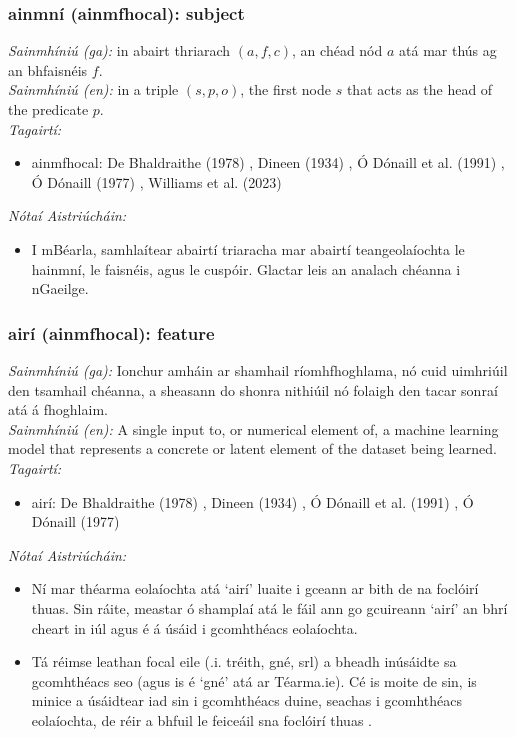 \documentclass{article}
\begin{document}
\subsubsection*{ainmní (ainmfhocal): subject}
 \noindent \textit{Sainmhíniú (ga):} in abairt thriarach $(a,f,c)$, an chéad nód $a$ atá mar thús ag an bhfaisnéis $f$.
\\
 \noindent \textit{Sainmhíniú (en):} in a triple $(s,p,o)$, the first node $s$ that acts as the head of the predicate $p$.
\\
 \noindent \textit{Tagairtí:}
\begin{itemize}
	\item ainmfhocal: De Bhaldraithe (1978) \cite{de-bhaldraithe}, Dineen (1934) \cite{dineen}, Ó Dónaill et al. (1991) \cite{focloir-beag}, Ó Dónaill (1977) \cite{odonaill}, Williams et al. (2023) \cite{storchiste}
\end{itemize}

 \noindent \textit{Nótaí Aistriúcháin:}
\begin{itemize}
	\item I mBéarla, samhlaítear abairtí triaracha mar abairtí teangeolaíochta le hainmní, le faisnéis, agus le cuspóir. Glactar leis an analach chéanna i nGaeilge.
\end{itemize}


\subsubsection*{airí (ainmfhocal): feature}
 \noindent \textit{Sainmhíniú (ga):} Ionchur amháin ar shamhail ríomhfhoghlama, nó cuid uimhriúil den tsamhail chéanna, a sheasann do shonra nithiúil nó folaigh den tacar sonraí atá á fhoghlaim.
\\
 \noindent \textit{Sainmhíniú (en):} A single input to, or numerical element of, a machine learning model that represents a concrete or latent element of the dataset being learned.
\\
 \noindent \textit{Tagairtí:}
\begin{itemize}
	\item airí: De Bhaldraithe (1978) \cite{de-bhaldraithe}, Dineen (1934) \cite{dineen}, Ó Dónaill et al. (1991) \cite{focloir-beag}, Ó Dónaill (1977) \cite{odonaill}
\end{itemize}

 \noindent \textit{Nótaí Aistriúcháin:}
\begin{itemize}
	\item Ní mar théarma eolaíochta atá `airí' luaite i gceann ar bith de na foclóirí thuas. Sin ráite, meastar ó shamplaí atá le fáil ann go gcuireann `airí' an bhrí cheart in iúl agus é á úsáid i gcomhthéacs eolaíochta.
	\item Tá réimse leathan focal eile (.i. tréith, gné, srl) a bheadh inúsáidte sa gcomhthéacs seo (agus is é `gné' atá ar Téarma.ie). Cé is moite de sin, is minice a úsáidtear iad sin i gcomhthéacs duine, seachas i gcomhthéacs eolaíochta, de réir a bhfuil le feiceáil sna foclóirí thuas .
\end{itemize}
\end{document}
